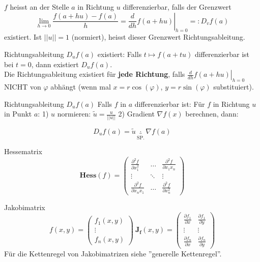 $f$ heisst an der Stelle $a$ in Richtung $u$ differenzierbar, falls der Grenzwert 
	\[
		\lim_{h\to0}\frac{f(a + hu) -f(a)}{h} =
		\left.\frac{d}{dh}f(a+hu)\right|_{h = 0}
		=: D_vf(a)
	\]
existiert. Ist $||u|| = 1$ (normiert), heisst dieser Grenzwert Richtungsableitung.

\begin{Rezept}{Richtungsableitung $D_uf(a)$ existiert:}{} Falls $t \mapsto f(a + tu)$ differenzierbar ist bei $t=0$, dann existiert $D_uf(a)$.\\

	Die Richtungsableitung existiert für \textbf{jede Richtung}, falls $\left.\frac{d}{dh} f(a + hu) \right|_{h=0}$ NICHT von $\varphi$ abhängt (wenn mal $x=r\cos(\varphi)$, $y=r\sin(\varphi)$ substituiert).
\end{Rezept}

\begin{Rezept}{Richtungsableitung $D_u f(a)$}{}
Falls $f$ in $a$ differenzierbar ist: Für $f$ in Richtung $u$ in Punkt $a$: 1) $u$ normieren: $\tilde{u} = \frac{u}{||u||}$ 2) Gradient $\nabla f(x)$ berechnen, dann:

\[
    D_u f(a) = \tilde{u} \underbrace{\cdot}_{\text{SP.}} \nabla f(a)
\]
\end{Rezept}

\begin{Definition}{Hessematrix}{}
\[
    \mathbf{Hess}(f) =
        \begin{pmatrix}
            \frac{\partial^2 f}{\partial x_1^2}&\hdots&\frac{\partial^2 f}{\partial x_1 x_n}\\
            \vdots&\ddots&\vdots\\
            \frac{\partial^2 f}{\partial x_n x_1}&\hdots&\frac{\partial^2 f}{\partial x_n^2}
        \end{pmatrix}
\]
\end{Definition}

\begin{Definition}{Jakobimatrix}{}
\[
    f(x, y) =
        \begin{pmatrix}
            f_1(x, y)\\
            \vdots\\
            f_n(x, y)
        \end{pmatrix}\ 
    \mathbf{J_f}(x, y) =
        \begin{pmatrix}
                \frac{\partial f_1}{\partial x} & \frac{\partial f_1}{\partial y}\\
                \vdots&\vdots\\
            \frac{\partial f_n}{\partial x} & \frac{\partial f_n}{\partial y}
        \end{pmatrix}
\]
Für die Kettenregel von Jakobimatrizen siehe ''generelle Kettenregel''.
\end{Definition}

